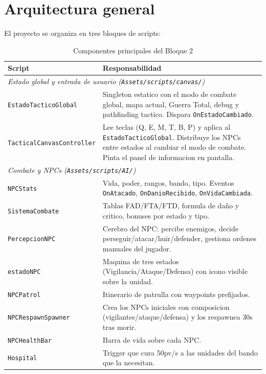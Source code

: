 \documentclass[12pt,a4paper]{article}
\begin{document}
\section{Arquitectura general}

El proyecto se organiza en tres bloques de scripts:

\begin{table}[H]
\centering
\caption{Componentes principales del Bloque 2}
\label{tab:arquitectura}
\renewcommand{\arraystretch}{1.15}
\begin{tabularx}{\textwidth}{l X}
\toprule
\textbf{Script} & \textbf{Responsabilidad} \\
\midrule
\multicolumn{2}{l}{\textit{Estado global y entrada de usuario (\texttt{Assets/scripts/canvas/})}} \\
\texttt{EstadoTacticoGlobal} & Singleton estatico con el modo de combate global, mapa actual, Guerra Total, debug y pathfinding tactico. Dispara \texttt{OnEstadoCambiado}. \\
\texttt{TacticalCanvasController} & Lee teclas (Q, E, M, T, B, P) y aplica al \texttt{EstadoTacticoGlobal}. Distribuye los NPCs entre estados al cambiar el modo de combate. Pinta el panel de informacion en pantalla. \\
\midrule
\multicolumn{2}{l}{\textit{Combate y NPCs (\texttt{Assets/scripts/AI/})}} \\
\texttt{NPCStats} & Vida, poder, rangos, bando, tipo. Eventos \texttt{OnAtacado}, \texttt{OnDanioRecibido}, \texttt{OnVidaCambiada}. \\
\texttt{SistemaCombate} & Tablas FAD/FTA/FTD, formula de daño y critico, bonuses por estado y tipo. \\
\texttt{PercepcionNPC} & Cerebro del NPC: percibe enemigos, decide perseguir/atacar/huir/defender, gestiona ordenes manuales del jugador. \\
\texttt{estadoNPC} & Maquina de tres estados (Vigilancia/Ataque/Defensa) con icono visible sobre la unidad. \\
\texttt{NPCPatrol} & Itinerario de patrulla con waypoints prefijados. \\
\texttt{NPCRespawnSpawner} & Crea los NPCs iniciales con composicion (vigilantes/ataque/defensa) y los respawnea 30s tras morir. \\
\texttt{NPCHealthBar} & Barra de vida sobre cada NPC. \\
\texttt{Hospital} & Trigger que cura 50pv/s a las unidades del bando que la necesitan. \\

\end{tabularx}
\end{table}
\end{document}
